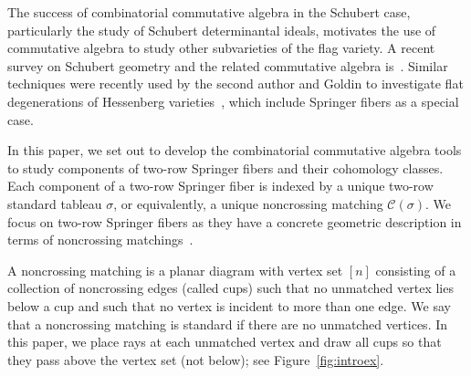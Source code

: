 \documentclass[11pt]{amsart}
\theoremstyle{remark}
\theoremstyle{remark}
\theoremstyle{definition}
\theoremstyle{definition}
\theoremstyle{definition}
\numberwithin{equation}{section}
\newcommand{\gs}{\sigma}
\newcommand{\cc}{\mathcal{C}}
\newcommand{\cupsigma}{\cc(\gs)}
\begin{document}
The success of combinatorial commutative algebra in the Schubert case, particularly the study of Schubert determinantal ideals, motivates the use of commutative algebra to study other subvarieties of the flag variety. A recent survey on Schubert geometry and the related commutative algebra is~\cite{WooYong2023}. Similar techniques were recently used by the second author and Goldin to investigate flat degenerations of Hessenberg varieties~\cite{GoldinPrecup25}, which include Springer fibers as a special case.


In this paper, we set out to develop the combinatorial commutative algebra tools to study components of two-row Springer fibers and their cohomology classes.   
Each component of a two-row Springer fiber is indexed by a unique two-row standard tableau $\gs$, or equivalently, a unique noncrossing matching $\cupsigma$. We focus on two-row Springer fibers as they have a concrete geometric description in terms of noncrossing matchings~\cite{Fung2003, StroppelWebster2012}. 


A noncrossing matching is a planar diagram with vertex set $[n]$ consisting of a collection of noncrossing edges (called cups) such that no unmatched vertex lies below a cup and such that no vertex is incident to more than one edge. We say that a noncrossing matching is standard if there are no unmatched vertices.  In this paper, we place rays at each unmatched vertex and draw all cups so that they pass above the vertex set (not below); see Figure~\ref{fig:introex}.
\end{document}
